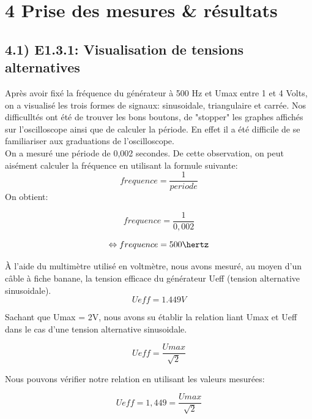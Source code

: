 \documentclass{report}
\begin{document}
\section*{4 Prise des mesures \& r\'esultats}
\subsection*{4.1) E1.3.1: Visualisation de tensions alternatives}
\hspace*{0.5cm}
Apr\`es avoir fix\'e la fr\'equence du g\'en\'erateur \`a 500 Hz et Umax entre 1 et 4 Volts, on a visualis\'e les trois formes de signaux: sinusoidale, triangulaire et carr\'ee. Nos difficullt\'es ont \'et\'e de trouver les bons boutons, de "stopper" les graphes affich\'es sur l'oscilloscope ainsi que de calculer la p\'eriode. En effet il a \'et\'e difficile de se familiariser aux graduations de l'oscilloscope.
\\
On a mesur\'e une p\'eriode de 0,002 secondes. De cette observation, on peut ais\'ement calculer la fr\'equence en utilisant la formule suivante:
\begin{equation}
   frequence = \frac{1}{periode}
\end{equation}
On obtient:

\begin{equation}
   frequence = \frac{1}{0,002}
\end{equation}

\begin{equation}
   \Leftrightarrow frequence = 500 \hertz
\end{equation}

\`A l'aide du multim\`etre utilis\'e en voltm\`etre, nous avons mesur\'e, au moyen d'un c\^able \`a fiche banane, la tension efficace du g\'en\'erateur Ueff (tension alternative sinusoidale).
\begin{equation}
   Ueff = 1.449 V
\end{equation}

Sachant que Umax = 2V, nous avons su \'etablir la relation liant Umax et Ueff dans le cas d'une tension alternative sinusoidale.

\begin{equation}
   Ueff = \frac{Umax}{\sqrt{2}}
\end{equation}

Nous pouvons v\'erifier notre relation en utilisant les valeurs mesur\'ees:

\begin{equation}
   Ueff = 1,449 = \frac{Umax}{\sqrt{2}}
\end{equation}
\end{document}
